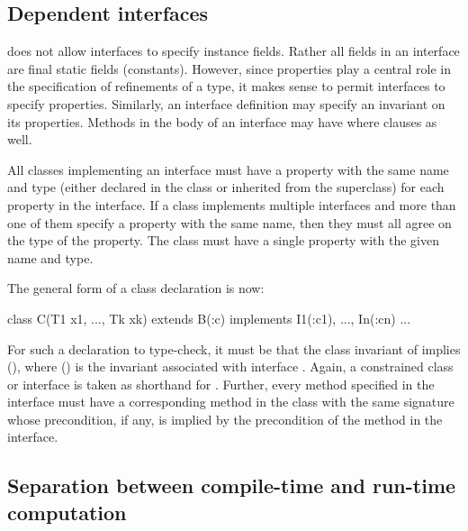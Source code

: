 
\subsection{Dependent interfaces}

\java{} does not allow interfaces to specify instance fields. Rather all
fields in an interface are final static fields (constants).
However,
since properties play a central role in the specification of
refinements of a type, it makes sense to permit interfaces to specify
properties.
Similarly, an interface
definition may specify an invariant on its properties.  Methods
in the body of an interface may have where clauses
as well.

All classes implementing an interface must have a property
with the same name and
type (either declared in the class or inherited from the superclass)
for each property in the interface. If a class implements
multiple interfaces and more than one of them specify a property
with the same name, then they must all agree on the type of the
property. The class must have a single property with the given name
and type.

The general form of a class declaration is now:
\begin{displayxten}
  class C(T1 x1, ..., Tk xk)
        extends B(:c)
        implements I1(:c1), ..., In(:cn) {...}
\end{displayxten}
\noindent
For such a declaration to type-check, it must be that the class
invariant of  implies \inv(), where
\inv() is the
invariant associated with interface .  Again, a constrained
class or interface  is taken as shorthand for .
Further, every method specified in the interface must have a
corresponding method in the class with the same signature whose
precondition, if any, is implied by the precondition of the method in
the interface.


\subsection{Separation between compile-time and run-time computation}

